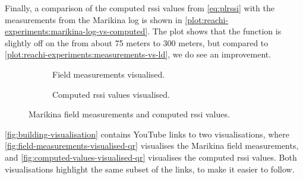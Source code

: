 %

Finally, a comparison of the computed \gls{rssi} values from \autoref{eq:plrssi} with the measurements from
the Marikina log is shown in \autoref{plot:reachi-experiments:marikina-log-vs-computed}. The plot shows that
the function is slightly off on the from about 75 meters to 300 meters, but compared to
\autoref{plot:reachi-experiments:measurements-vs-ld}, we do see an improvement.

\begin{figure}[ht]
    \centering
    \begin{subfigure}[b]{0.48\textwidth}
        \centering
        \caption{Field measurements visualised.}
        \label{fig:field-measurements-visualised-qr}
    \end{subfigure}
    \hfill
    \begin{subfigure}[b]{0.48\textwidth}
        \centering
        \caption{Computed \gls{rssi} values visualised.}
        \label{fig:computed-values-visualised-qr}
    \end{subfigure}
    \caption{Marikina field measurements and computed \gls{rssi} values.}
    \label{fig:building-visualisation}
\end{figure}

\autoref{fig:building-visualisation} contains YouTube links to two visualisations, where 
\autoref{fig:field-measurements-visualised-qr} visualises the Marikina field measurements, and 
\autoref{fig:computed-values-visualised-qr} visualises the computed \gls{rssi} values. Both visualisations
highlight the same subset of the links, to make it easier to follow. \medbreak


